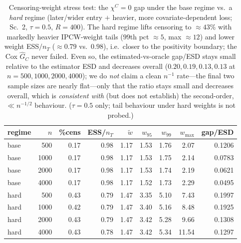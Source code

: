 \begin{table}[t]\centering\small
\caption{Censoring-weight stress test: the $\chi^C=0$ gap under the base regime vs.\ a \emph{hard} regime (later/wider entry $+$ heavier, more covariate-dependent loss; Sc.\ 2, $\tau=0.5$, $R=400$). The hard regime lifts censoring to $\approx43\%$ with markedly heavier IPCW-weight tails ($99$th pct $\approx5$, max $\approx12$) and lower weight ESS$/n_T$ ($\approx0.79$ vs.\ $0.98$), i.e.\ closer to the positivity boundary; the Cox $\widehat G_C$ never failed. Even so, the estimated-vs-oracle gap/ESD stays small relative to the estimator ESD and decreases overall ($0.20,0.19,0.13,0.13$ at $n=500,1000,2000,4000$); we do \emph{not} claim a clean $n^{-1}$ rate---the final two sample sizes are nearly flat---only that the ratio stays small and decreases overall, which is \emph{consistent with} (but does not establish) the second-order, $\ll n^{-1/2}$ behaviour. ($\tau=0.5$ only; tail behaviour under hard weights is not probed.)}
\label{tab:censhard}\begin{tabular}{lr rr rrrr r}\toprule
regime&$n$&\%cens&ESS/$n_T$&$\widetilde w$&$w_{95}$&$w_{99}$&$w_{\max}$&gap/ESD\\\midrule
base & 500 & 0.17 & 0.98 & 1.17 & 1.53 & 1.76 & 2.07 & 0.1206 \\
base & 1000 & 0.17 & 0.98 & 1.17 & 1.53 & 1.75 & 2.14 & 0.0783 \\
base & 2000 & 0.17 & 0.98 & 1.17 & 1.53 & 1.74 & 2.19 & 0.0621 \\
base & 4000 & 0.17 & 0.98 & 1.17 & 1.52 & 1.73 & 2.29 & 0.0495 \\
\addlinespace
hard & 500 & 0.43 & 0.79 & 1.47 & 3.35 & 5.10 & 7.43 & 0.1997 \\
hard & 1000 & 0.42 & 0.79 & 1.47 & 3.40 & 5.16 & 8.48 & 0.1925 \\
hard & 2000 & 0.43 & 0.79 & 1.47 & 3.42 & 5.28 & 9.66 & 0.1308 \\
hard & 4000 & 0.43 & 0.78 & 1.47 & 3.42 & 5.34 & 11.54 & 0.1297 \\
\bottomrule\end{tabular}\end{table}
